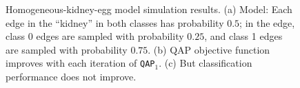 \documentclass{article} %
\begin{document}
\begin{figure}[ht]
\centering
{}
\label{fig:homo}
\caption{Homogeneous-kidney-egg model simulation results. (a) Model: Each edge in the ``kidney'' in both classes has probability $0.5$; in the edge, class 0 edges are sampled with probability $0.25$, and class 1 edges are sampled with probability $0.75$. (b) QAP objective function improves with each iteration of \texttt{QAP}$_1$. (c) But classification performance does not improve.}
\end{figure}
\end{document}
